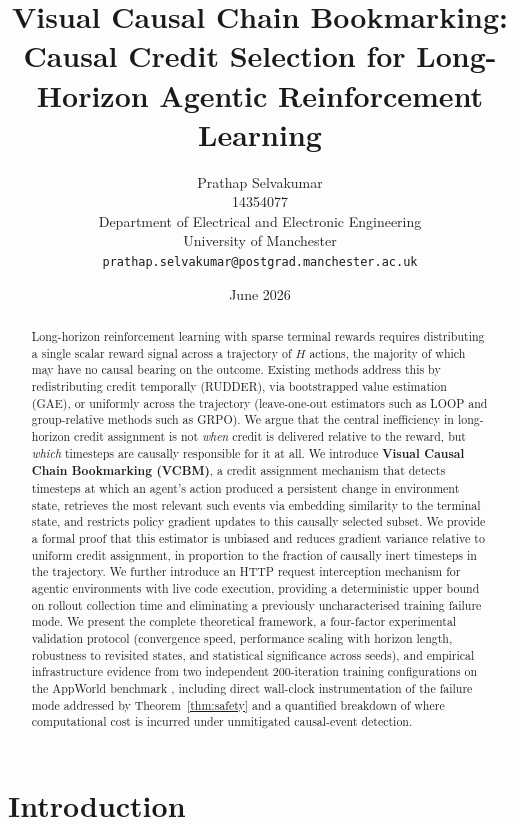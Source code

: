 \documentclass[11pt]{article}
\title{\textbf{Visual Causal Chain Bookmarking: Causal Credit Selection for Long-Horizon Agentic Reinforcement Learning}}
\author{
Prathap Selvakumar \\
14354077  \\
Department of Electrical and Electronic Engineering \\
University of Manchester \\
\texttt{prathap.selvakumar@postgrad.manchester.ac.uk}
}
\date{June 2026}
\begin{document}
\maketitle

\begin{abstract}
Long-horizon reinforcement learning with sparse terminal rewards requires
distributing a single scalar reward signal across a trajectory of $H$ actions,
the majority of which may have no causal bearing on the outcome. Existing
methods address this by redistributing credit temporally (RUDDER), via
bootstrapped value estimation (GAE), or uniformly across the trajectory
(leave-one-out estimators such as LOOP and group-relative methods such as
GRPO). We argue that the central inefficiency in long-horizon credit
assignment is not \emph{when} credit is delivered relative to the reward, but
\emph{which} timesteps are causally responsible for it at all. We introduce
\textbf{Visual Causal Chain Bookmarking (VCBM)}, a credit assignment mechanism
that detects timesteps at which an agent's action produced a persistent change
in environment state, retrieves the most relevant such events via embedding
similarity to the terminal state, and restricts policy gradient updates to
this causally selected subset. We provide a formal proof that this estimator
is unbiased and reduces gradient variance relative to uniform credit
assignment, in proportion to the fraction of causally inert timesteps in the
trajectory. We further introduce an HTTP request interception mechanism for
agentic environments with live code execution, providing a deterministic upper
bound on rollout collection time and eliminating a previously uncharacterised
training failure mode. We present the complete theoretical framework, a
four-factor experimental validation protocol (convergence speed, performance
scaling with horizon length, robustness to revisited states, and statistical
significance across seeds), and empirical infrastructure evidence from two
independent 200-iteration training configurations on the AppWorld benchmark
\cite{appworld2024},
including direct wall-clock instrumentation of the failure mode addressed by
Theorem~\ref{thm:safety} and a quantified breakdown of where computational
cost is incurred under unmitigated causal-event detection.
\end{abstract}

\clearpage
\tableofcontents
\clearpage

\section{Introduction}
\end{document}
